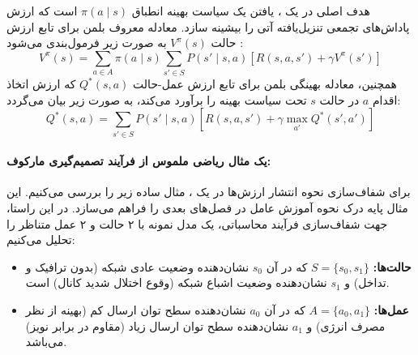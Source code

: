 \documentclass[oneside,openany,phd]{TMU-Thesis}
\begin{document}
هدف اصلی در یک ، یافتن یک سیاست بهینه انطباق $\pi(a \mid s)$ است که ارزش پاداش‌های تجمعی تنزیل‌یافته آتی را بیشینه سازد. معادله معروف بلمن برای تابع ارزش حالت $V^\pi(s)$ به صورت زیر فرمول‌بندی می‌شود \cite{sutton2018reinforcement}:
$$V^\pi(s) = \sum_{a \in A} \pi(a \mid s) \sum_{s' \in S} P(s' \mid s, a) \left[ R(s, a, s') + \gamma V^\pi(s') \right]$$
همچنین، معادله بهینگی بلمن برای تابع ارزش عمل-حالت $Q^*(s, a)$ که ارزش اتخاذ اقدام $a$ در حالت $s$ تحت سیاست بهینه را برآورد می‌کند، به صورت زیر بیان می‌گردد:
$$Q^*(s, a) = \sum_{s' \in S} P(s' \mid s, a) \left[ R(s, a, s') + \gamma \max_{a'} Q^*(s', a') \right]$$

\paragraph{یک مثال ریاضی ملموس از فرآیند تصمیم‌گیری مارکوف:}
برای شفاف‌سازی نحوه انتشار ارزش‌ها در یک ، مثال ساده زیر را بررسی می‌کنیم. این مثال پایه درک نحوه آموزش عامل در فصل‌های بعدی را فراهم می‌سازد. در این راستا، جهت شفاف‌سازی فرآیند محاسباتی، یک مدل نمونه با ۲ حالت و ۲ عمل متناظر را تحلیل می‌کنیم:
\begin{itemize}
    \item \textbf{حالت‌ها:} $S = \{s_0, s_1\}$ که در آن $s_0$ نشان‌دهنده وضعیت عادی شبکه (بدون ترافیک و تداخل) و $s_1$ نشان‌دهنده وضعیت اشباع شبکه (وقوع اختلال شدید کانال) است.
    \item \textbf{عمل‌ها:} $A = \{a_0, a_1\}$ که در آن $a_0$ نشان‌دهنده سطح توان ارسال کم (بهینه از نظر مصرف انرژی) و $a_1$ نشان‌دهنده سطح توان ارسال زیاد (مقاوم در برابر نویز) می‌باشد.
\end{itemize}
\end{document}
